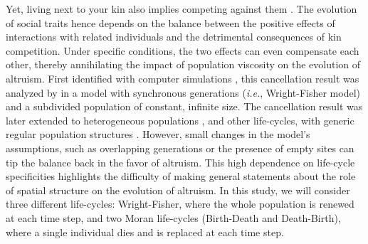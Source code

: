 \documentclass[11pt, letterpaper]{article}
\newcommand{\ie}{\textit{i.e.}}
\begin{document}
Yet, living next to your kin also implies competing against them \citep{West2002}. The evolution of social traits hence depends on the balance between the positive effects of interactions with related individuals and the detrimental consequences of kin competition. Under specific conditions, the two effects can even compensate each other, thereby annihilating the impact of population viscosity on the evolution of altruism. 
First identified with computer simulations \citep{Wilson1992}, this cancellation result was analyzed by \citet{Taylor1992islandmodel} in a model with synchronous generations (\ie, Wright-Fisher model) and a subdivided population of constant, infinite size. The cancellation result was later extended to heterogeneous populations \citep[][with synchronous generations and infinite population size]{RodriguesGardner2012}, and other life-cycles, with generic regular population structures \citep[][with synchronous generations but also with continuous generations and Birth-Death updating]{Taylor2011}. However, small changes in the model's assumptions, such as overlapping generations \citep{TaylorIrwin2000} or the presence of empty sites \citep{Alizon2008} can tip the balance back in the favor of altruism. 
This high dependence on life-cycle specificities highlights the difficulty of making general statements about the role of spatial structure on the evolution of altruism. 
In this study, we will consider three different life-cycles: Wright-Fisher, where the whole population is renewed at each time step, and two Moran life-cycles (Birth-Death and Death-Birth), where a single individual dies and is replaced at each time step. 
\end{document}
